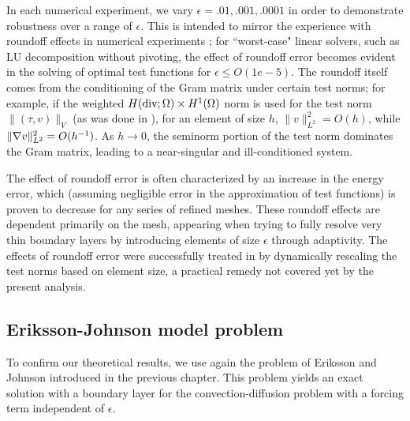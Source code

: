 In each numerical experiment, we vary $\epsilon = .01, .001, .0001$ in order to demonstrate robustness over a range of $\epsilon$.  This is intended to mirror the experience with roundoff effects in numerical experiments \cite{DPGrobustness}; for ``worst-case" linear solvers, such as LU decomposition without pivoting, the effect of roundoff error becomes evident in the solving of optimal test functions for $\epsilon \leq O(1e-5)$.  The roundoff itself comes from the conditioning of the Gram matrix under certain test norms; for example, if the weighted $H({\rm div};\Omega)\times H^1(\Omega)$ norm is used for the test norm $\|\left(\tau,v\right)\|_V$ (as was done in \cite{DPG2}), for an element of size $h$, $\|v\|_{L^2}^2 = O(h)$, while $\|\grad v\|_{L^2}^2 = O(h^{-1})$. As $h\rightarrow 0$, the seminorm portion of the test norm dominates the Gram matrix, leading to a near-singular and ill-conditioned system. 

The effect of roundoff error is often characterized by an increase in the energy error, which (assuming negligible error in the approximation of test functions) is proven to decrease for any series of refined meshes. These roundoff effects are dependent primarily on the mesh, appearing when trying to fully resolve very thin boundary layers by introducing elements of size $\epsilon$ through adaptivity. The effects of roundoff error were successfully treated in \cite{DPG3} by dynamically rescaling the test norms based on element size, a practical remedy not covered yet by the present analysis. 

\subsection{Eriksson-Johnson model problem}

To confirm our theoretical results, we use again the problem of Eriksson and Johnson \cite{Eriksson1993} introduced in the previous chapter.  This problem yields an exact solution with a boundary layer for the convection-diffusion problem with a forcing term independent of $\epsilon$.
%

